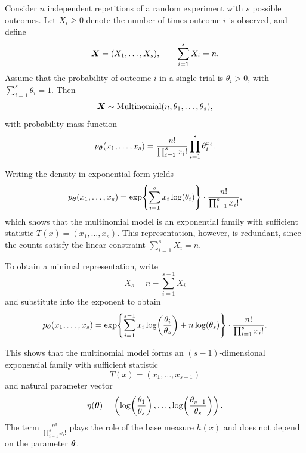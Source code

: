 \begin{ex}
Consider \(n\) independent repetitions of a random experiment with \(s\) possible outcomes.
Let \(X_i \ge 0\) denote the number of times outcome \(i\) is observed, and define
\[
\boldsymbol{X} = (X_1,\dots,X_s), \qquad \sum_{i=1}^s X_i = n.
\]
Assume that the probability of outcome \(i\) in a single trial is \(\theta_i>0\), with
\(\sum\limits_{i=1}^s \theta_i = 1\).
Then
\[
\boldsymbol{X} \sim \text{Multinomial}(n,\theta_1,\dots,\theta_s),
\]
with probability mass function
\[
p_{\boldsymbol{\theta}}(x_1,\dots,x_s)
= \frac{n!}{\prod_{i=1}^s x_i!}\prod_{i=1}^s \theta_i^{x_i}.
\]

Writing the density in exponential form yields
\[
p_{\boldsymbol{\theta}}(x_1,\dots,x_s)
= \exp\!\left\{\sum_{i=1}^s x_i \log(\theta_i)\right\}
\cdot \frac{n!}{\prod_{i=1}^s x_i!},
\]
which shows that the multinomial model is an exponential family with sufficient statistic
\(T(x)=(x_1,\dots,x_s)\).
This representation, however, is redundant, since the counts satisfy the linear constraint
\(\sum_{i=1}^s X_i=n\).

To obtain a minimal representation, write
\[
X_s = n - \sum_{i=1}^{s-1} X_i
\]
and substitute into the exponent to obtain
\[
p_{\boldsymbol{\theta}}(x_1,\dots,x_s)
= \exp\!\left\{
\sum_{i=1}^{s-1} x_i \log\!\left(\frac{\theta_i}{\theta_s}\right)
+ n \log(\theta_s)
\right\}
\cdot \frac{n!}{\prod_{i=1}^s x_i!}.
\]

This shows that the multinomial model forms an \((s-1)\)-dimensional exponential family with
sufficient statistic
\[
T(x) = (x_1,\dots,x_{s-1})
\]
and natural parameter vector
\[
\eta(\boldsymbol{\theta})
= \left(
\log\!\left(\frac{\theta_1}{\theta_s}\right),
\dots,
\log\!\left(\frac{\theta_{s-1}}{\theta_s}\right)
\right).
\]
The term \(\frac{n!}{\prod_{i=1}^s x_i!}\) plays the role of the base measure \(h(x)\) and does
not depend on the parameter \(\boldsymbol{\theta}\).
\end{ex}

